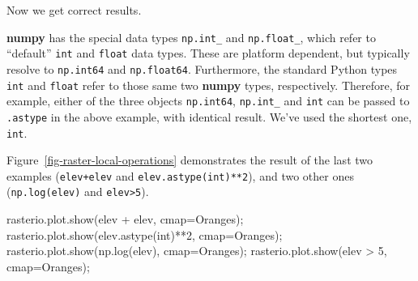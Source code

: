 \documentclass[
  letterpaper,
]{krantz}
\newenvironment{Shaded}{\begin{snugshade}}{\end{snugshade}}
\newcommand{\BuiltInTok}[1]{\textcolor[rgb]{0.00,0.23,0.31}{#1}}
\newcommand{\DecValTok}[1]{\textcolor[rgb]{0.68,0.00,0.00}{#1}}
\newcommand{\NormalTok}[1]{\textcolor[rgb]{0.00,0.23,0.31}{#1}}
\newcommand{\OperatorTok}[1]{\textcolor[rgb]{0.37,0.37,0.37}{#1}}
\newcommand{\StringTok}[1]{\textcolor[rgb]{0.13,0.47,0.30}{#1}}
\begin{document}
Now we get correct results.

\begin{tcolorbox}[enhanced jigsaw, title=\textcolor{quarto-callout-note-color}{\faInfo}\hspace{0.5em}{Note}, arc=.35mm, toprule=.15mm, titlerule=0mm, colframe=quarto-callout-note-color-frame, breakable, toptitle=1mm, bottomtitle=1mm, rightrule=.15mm, colbacktitle=quarto-callout-note-color!10!white, leftrule=.75mm, left=2mm, bottomrule=.15mm, opacityback=0, coltitle=black, opacitybacktitle=0.6, colback=white]

\textbf{numpy} has the special data types \texttt{np.int\_} and
\texttt{np.float\_}, which refer to ``default'' \texttt{int} and
\texttt{float} data types. These are platform dependent, but typically
resolve to \texttt{np.int64} and \texttt{np.float64}. Furthermore, the
standard Python types \texttt{int} and \texttt{float} refer to those
same two \textbf{numpy} types, respectively. Therefore, for example,
either of the three objects \texttt{np.int64}, \texttt{np.int\_} and
\texttt{int} can be passed to \texttt{.astype} in the above example,
with identical result. We've used the shortest one, \texttt{int}.

\end{tcolorbox}

Figure~\ref{fig-raster-local-operations} demonstrates the result of the
last two examples (\texttt{elev+elev} and \texttt{elev.astype(int)**2}),
and two other ones (\texttt{np.log(elev)} and
\texttt{elev\textgreater{}5}).

\begin{Shaded}
\begin{Highlighting}[]
\NormalTok{rasterio.plot.show(elev }\OperatorTok{+}\NormalTok{ elev, cmap}\OperatorTok{=}\StringTok{\textquotesingle{}Oranges\textquotesingle{}}\NormalTok{)}\OperatorTok{;}
\NormalTok{rasterio.plot.show(elev.astype(}\BuiltInTok{int}\NormalTok{)}\OperatorTok{**}\DecValTok{2}\NormalTok{, cmap}\OperatorTok{=}\StringTok{\textquotesingle{}Oranges\textquotesingle{}}\NormalTok{)}\OperatorTok{;}
\NormalTok{rasterio.plot.show(np.log(elev), cmap}\OperatorTok{=}\StringTok{\textquotesingle{}Oranges\textquotesingle{}}\NormalTok{)}\OperatorTok{;}
\NormalTok{rasterio.plot.show(elev }\OperatorTok{\textgreater{}} \DecValTok{5}\NormalTok{, cmap}\OperatorTok{=}\StringTok{\textquotesingle{}Oranges\textquotesingle{}}\NormalTok{)}\OperatorTok{;}
\end{Highlighting}
\end{Shaded}
\end{document}
